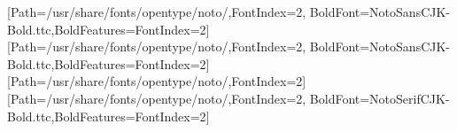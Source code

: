 \usepackage{fontspec}
\usepackage{xeCJK}
[Path=/usr/share/fonts/opentype/noto/,FontIndex=2,
  BoldFont=NotoSansCJK-Bold.ttc,BoldFeatures={FontIndex=2}]
\newCJKfontfamily{}[Path=/usr/share/fonts/opentype/noto/,FontIndex=2,
  BoldFont=NotoSansCJK-Bold.ttc,BoldFeatures={FontIndex=2}]
\newCJKfontfamily{}[Path=/usr/share/fonts/opentype/noto/,FontIndex=2]
\newCJKfontfamily{}[Path=/usr/share/fonts/opentype/noto/,FontIndex=2,
  BoldFont=NotoSerifCJK-Bold.ttc,BoldFeatures={FontIndex=2}]
\setmainfont{TeX Gyre Heros}
\usetikzlibrary{calc}

